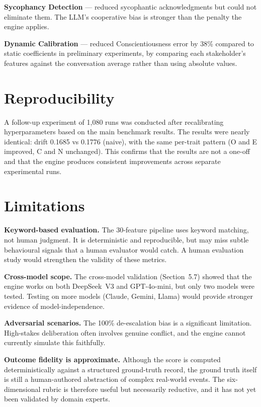 \documentclass[12pt, a4paper]{report}
\begin{document}
\textbf{Sycophancy Detection} --- reduced sycophantic acknowledgments but could not eliminate them. The LLM's cooperative bias is stronger than the penalty the engine applies.

\textbf{Dynamic Calibration} --- reduced Conscientiousness error by 38\% compared to static coefficients in preliminary experiments, by comparing each stakeholder's features against the conversation average rather than using absolute values.


\section{Reproducibility}

A follow-up experiment of 1,080 runs was conducted after recalibrating hyperparameters based on the main benchmark results. The results were nearly identical: drift 0.1685 vs 0.1776 (naive), with the same per-trait pattern (O and E improved, C and N unchanged). This confirms that the results are not a one-off and that the engine produces consistent improvements across separate experimental runs.


\section{Limitations}

\textbf{Keyword-based evaluation.} The 30-feature pipeline uses keyword matching, not human judgment. It is deterministic and reproducible, but may miss subtle behavioural signals that a human evaluator would catch. A human evaluation study would strengthen the validity of these metrics.

\textbf{Cross-model scope.} The cross-model validation (Section~5.7) showed that the engine works on both DeepSeek~V3 and GPT-4o-mini, but only two models were tested. Testing on more models (Claude, Gemini, Llama) would provide stronger evidence of model-independence.

\textbf{Adversarial scenarios.} The 100\% de-escalation bias is a significant limitation. High-stakes deliberation often involves genuine conflict, and the engine cannot currently simulate this faithfully.

\textbf{Outcome fidelity is approximate.} Although the score is computed deterministically against a structured ground-truth record, the ground truth itself is still a human-authored abstraction of complex real-world events. The six-dimensional rubric is therefore useful but necessarily reductive, and it has not yet been validated by domain experts.
\end{document}
